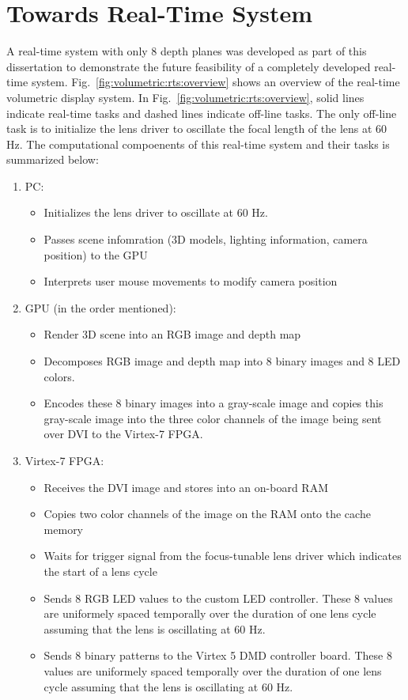 \section{Towards Real-Time System}


A real-time system with only 8 depth planes was developed as part of this dissertation to demonstrate the future feasibility of a completely developed real-time system.
Fig.~\ref{fig:volumetric:rts:overview} shows an overview of the real-time volumetric display system.
In Fig.~\ref{fig:volumetric:rts:overview}, solid lines indicate real-time tasks and dashed lines indicate off-line tasks.
The only off-line task is to initialize the lens driver to oscillate the focal length of the lens at 60 Hz. 
The computational compoenents of this real-time system and their tasks is summarized below:

\begin{enumerate}
    \item PC:
    \begin{itemize}
        \item Initializes the lens driver to oscillate at 60 Hz. 
        \item Passes scene infomration (3D models, lighting information, camera position) to the GPU
        \item Interprets user mouse movements to modify camera position
    \end{itemize}
    \item GPU (in the order mentioned):
    \begin{itemize}
        \item Render 3D scene into an RGB image and depth map
        \item Decomposes RGB image and depth map into 8 binary images and 8 LED colors.
        \item Encodes these 8 binary images into a gray-scale image and copies this gray-scale image into the three color channels of the image being sent over DVI to the Virtex-7 FPGA.
    \end{itemize}
    \item Virtex-7 FPGA:
    \begin{itemize}
        \item Receives the DVI image and stores into an on-board RAM
        \item Copies two color channels of the image on the RAM onto the cache  memory
        \item Waits for trigger signal from the focus-tunable lens driver which indicates the start of a lens cycle
        \item Sends 8 RGB LED values to the custom LED controller. These 8 values are uniformely spaced temporally over the duration of one lens cycle assuming that the lens is oscillating at 60 Hz.
        \item Sends 8 binary patterns to the Virtex 5 DMD controller board. These 8 values are uniformely spaced temporally over the duration of one lens cycle assuming that the lens is oscillating at 60 Hz.
    \end{itemize}
\end{enumerate}

